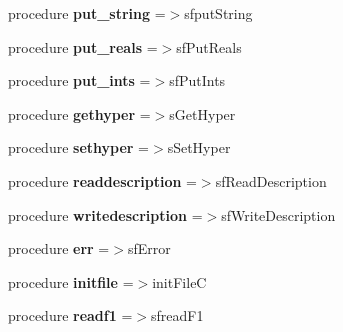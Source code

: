\begin{DoxyCompactItemize}
\item 
\mbox{\label{structc__regfile__mod_1_1cfile_a6b312ac5dc7c3cdc7aab3abea72aeda1}} 
procedure {\bfseries put\+\_\+string} =$>$sfput\+String
\item 
\mbox{\label{structc__regfile__mod_1_1cfile_a13a1603e9b54aded63b75c0ee087bd17}} 
procedure {\bfseries put\+\_\+reals} =$>$sf\+Put\+Reals
\item 
\mbox{\label{structc__regfile__mod_1_1cfile_aade29c0f21347bd39853190dcfdc8a81}} 
procedure {\bfseries put\+\_\+ints} =$>$sf\+Put\+Ints
\item 
\mbox{\label{structc__regfile__mod_1_1cfile_aca9afcde3829484c9e86549c2b3b24ed}} 
procedure {\bfseries gethyper} =$>$s\+Get\+Hyper
\item 
\mbox{\label{structc__regfile__mod_1_1cfile_abb3c0e21e44cf0c2552646439e335b5f}} 
procedure {\bfseries sethyper} =$>$s\+Set\+Hyper
\item 
\mbox{\label{structc__regfile__mod_1_1cfile_a1a3e6f920d49c2189a5d3340e3a50337}} 
procedure {\bfseries readdescription} =$>$sf\+Read\+Description
\item 
\mbox{\label{structc__regfile__mod_1_1cfile_a0b24231b3d8d64197cdf0c0e9daf9421}} 
procedure {\bfseries writedescription} =$>$sf\+Write\+Description
\item 
\mbox{\label{structc__regfile__mod_1_1cfile_aa0206323b6f2ad51f02405af32465dfd}} 
procedure {\bfseries err} =$>$sf\+Error
\item 
\mbox{\label{structc__regfile__mod_1_1cfile_ab6f2e5fae32051fb01de1838ee8c4279}} 
procedure {\bfseries initfile} =$>$init\+FileC
\item 
\mbox{\label{structc__regfile__mod_1_1cfile_aefc05e5402bc344f431204484ebb3e19}} 
procedure {\bfseries readf1} =$>$sfread\+F1
\item 

\end{DoxyCompactItemize}
